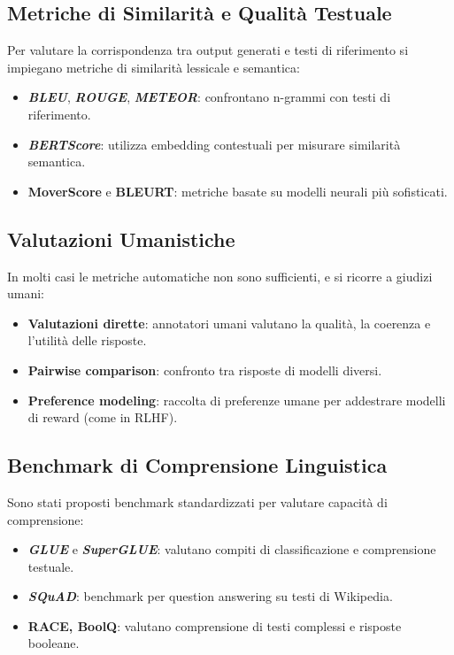 \subsection{Metriche di Similarità e Qualità Testuale}
Per valutare la corrispondenza tra output generati e testi di riferimento 
si impiegano metriche di similarità lessicale e semantica:
\begin{itemize}
    \item \textbf{\textit{BLEU}}, \textbf{\textit{ROUGE}}, \textbf{\textit{METEOR}}: confrontano n-grammi con testi di riferimento.
    \item \textbf{\textit{BERTScore}}: utilizza embedding contestuali per misurare similarità semantica.
    \item \textbf{MoverScore} e \textbf{BLEURT}: metriche basate su modelli neurali più sofisticati.
\end{itemize}

\subsection{Valutazioni Umanistiche}
In molti casi le metriche automatiche non sono sufficienti, 
e si ricorre a giudizi umani:
\begin{itemize}
    \item \textbf{Valutazioni dirette}: annotatori umani valutano la qualità, la coerenza e l'utilità delle risposte.
    \item \textbf{Pairwise comparison}: confronto tra risposte di modelli diversi.
    \item \textbf{Preference modeling}: raccolta di preferenze umane per addestrare modelli di reward (come in RLHF).
\end{itemize}

\subsection{Benchmark di Comprensione Linguistica}
Sono stati proposti benchmark standardizzati per valutare capacità di comprensione:
\begin{itemize}
    \item \textbf{\textit{GLUE}} e \textbf{\textit{SuperGLUE}}: valutano compiti di classificazione e comprensione testuale.
    \item \textbf{\textit{SQuAD}}: benchmark per question answering su testi di Wikipedia.
    \item \textbf{RACE, BoolQ}: valutano comprensione di testi complessi e risposte booleane.
\end{itemize}

